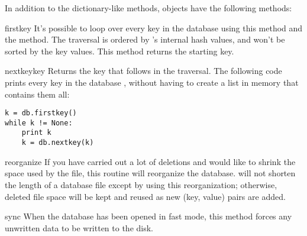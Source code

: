 In addition to the dictionary-like methods,  objects have the
following methods:

\begin{funcdesc}{firstkey}{}
It's possible to loop over every key in the database using this method 
and the  method.  The traversal is ordered by
's internal hash values, and won't be sorted by the key
values.  This method returns the starting key.
\end{funcdesc}

\begin{funcdesc}{nextkey}{key}
Returns the key that follows  in the traversal.  The
following code prints every key in the database , without
having to create a list in memory that contains them all:

\begin{verbatim}
k = db.firstkey()
while k != None:
    print k
    k = db.nextkey(k)
\end{verbatim}
\end{funcdesc}

\begin{funcdesc}{reorganize}{}
If you have carried out a lot of deletions and would like to shrink
the space used by the  file, this routine will reorganize
the database.   will not shorten the length of a database
file except by using this reorganization; otherwise, deleted file
space will be kept and reused as new (key, value) pairs are added.
\end{funcdesc}

\begin{funcdesc}{sync}{}
When the database has been opened in fast mode, this method forces any 
unwritten data to be written to the disk.
\end{funcdesc}


\begin{seealso}
\end{seealso}
